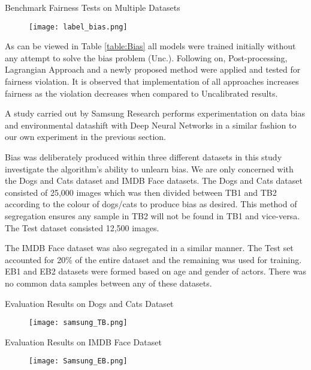 \enlargethispage{\baselineskip}
\begin{table}[H]
    \bigskip
    \caption{Benchmark Fairness Tests on Multiple Datasets \cite{Jiang}}
    \begin{figure}[H]
        \texttt{[image: label\_bias.png]}
        \centering
    \end{figure}
    \label{table:fairness}
\end{table}

As can be viewed in Table \ref{table:Bias} all models were trained initially without any attempt to solve the bias problem (Unc.).
Following on, Post-processing, Lagrangian Approach and a newly proposed method were applied and tested for fairness violation.
It is observed that implementation of all approaches increases fairness as the violation decreases when compared to Uncalibrated results.

\bigskip
A study carried out by Samsung Research \cite{8953715} performs experimentation on data bias and environmental datashift with Deep Neural Networks in a similar fashion to our own experiment in the previous section.

Bias was deliberately produced within three different datasets in this study investigate the algorithm's ability to unlearn bias. 
We are only concerned with the Dogs and Cats dataset and IMDB Face datasets.
The Dogs and Cats dataset consisted of 25,000 images which was then divided between TB1 and TB2 according to the colour of dogs/cats to produce bias as desired.
This method of segregation ensures any sample in TB2 will not be found in TB1 and vice-versa.
The Test dataset consisted 12,500 images. 

The IMDB Face dataset was also segregated in a similar manner.
The Test set accounted for 20\% of the entire dataset and the remaining was used for training.
EB1 and EB2 datasets were formed based on age and gender of actors. There was no common data samples between any of these datasets.

\begin{table}[H]
    \caption{Evaluation Results on Dogs and Cats Dataset \cite{8953715}}
    \begin{figure}[H]
        \texttt{[image: samsung\_TB.png]}
        \centering
    \end{figure}
    \label{table:Dogs and Cats}
\end{table}

\begin{table}[H]
    \caption{Evaluation Results on IMDB Face Dataset \cite{8953715}}
    \begin{figure}[H]
        \texttt{[image: Samsung\_EB.png]}
        \centering
    \end{figure}
    \label{table:IMDB}
\end{table}

